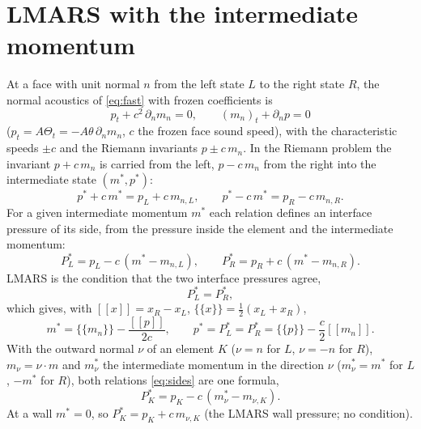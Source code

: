 \documentclass[11pt,a4paper]{article}
\newcommand{\avg}[1]{\{\!\{#1\}\!\}}
\newcommand{\jump}[1]{[\![#1]\!]}
\begin{document}
\section{LMARS with the intermediate momentum}
At a face with unit normal $n$ from the left state $L$ to the right state $R$, the normal acoustics of \eqref{eq:fast} with frozen
coefficients is
\[
p_t+c^2\,\partial_n m_n=0,\qquad (m_n)_t+\partial_n p=0
\]
($p_t=A\Theta_t=-A\theta\,\partial_nm_n$, $c$ the frozen face sound speed), with the characteristic speeds $\pm c$ and the Riemann invariants
$p\pm c\,m_n$. In the Riemann problem the invariant $p+c\,m_n$ is carried from the left, $p-c\,m_n$ from the right into the
intermediate state $(m^*,p^*)$:
\[
p^*+c\,m^*=p_L+c\,m_{n,L},\qquad p^*-c\,m^*=p_R-c\,m_{n,R}.
\]
For a given intermediate momentum $m^*$ each relation defines an interface pressure of its side, from the pressure inside
the element and the intermediate momentum:
\begin{equation}
P_L^*=p_L-c\,(m^*-m_{n,L}),\qquad P_R^*=p_R+c\,(m^*-m_{n,R}).\label{eq:sides}
\end{equation}
LMARS is the condition that the two interface pressures agree,
\begin{equation}
P_L^*=P_R^*,\label{eq:equal}
\end{equation}
which gives, with $\jump x=x_R-x_L$, $\avg x=\tfrac12(x_L+x_R)$,
\begin{equation}
m^*=\avg{m_n}-\frac{\jump p}{2c},\qquad p^*=P_L^*=P_R^*=\avg p-\frac c2\jump{m_n}.\label{eq:lmars}
\end{equation}
With the outward normal $\nu$ of an element $K$ ($\nu=n$ for $L$, $\nu=-n$ for $R$), $m_\nu=\nu\cdot m$ and $m^*_\nu$ the intermediate momentum
in the direction $\nu$ ($m^*_\nu=m^*$ for $L$, $-m^*$ for $R$), both relations \eqref{eq:sides} are one formula,
\begin{equation}
P_K^*=p_K-c\,(m^*_\nu-m_{\nu,K}).\label{eq:side}
\end{equation}
At a wall $m^*=0$, so $P_K^*=p_K+c\,m_{\nu,K}$ (the LMARS wall pressure; no condition).
\end{document}
